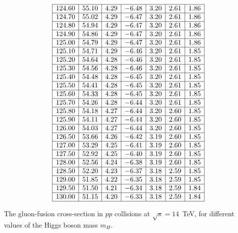\begin{table}[!h]
\begin{center}
\begin{equation}
\begin{array}{|c|c|c|c|c|c|c|}
\hline 
124.60 & 55.10 & 4.29 & -6.48 & 3.20 & 2.61 & 1.86\\
\hline 
124.70 & 55.02 & 4.29 & -6.47 & 3.20 & 2.61 & 1.86\\
\hline 
124.80 & 54.94 & 4.29 & -6.47 & 3.20 & 2.61 & 1.86\\
\hline 
124.90 & 54.86 & 4.29 & -6.47 & 3.20 & 2.61 & 1.86\\
\hline 
125.00 & 54.79 & 4.29 & -6.47 & 3.20 & 2.61 & 1.86\\
\hline 
125.10 & 54.71 & 4.29 & -6.46 & 3.20 & 2.61 & 1.85\\
\hline 
125.20 & 54.64 & 4.28 & -6.46 & 3.20 & 2.61 & 1.85\\
\hline 
125.30 & 54.56 & 4.28 & -6.46 & 3.20 & 2.61 & 1.85\\
\hline 
125.40 & 54.48 & 4.28 & -6.45 & 3.20 & 2.61 & 1.85\\
\hline 
125.50 & 54.41 & 4.28 & -6.45 & 3.20 & 2.61 & 1.85\\
\hline 
125.60 & 54.33 & 4.28 & -6.45 & 3.20 & 2.61 & 1.85\\
\hline 
125.70 & 54.26 & 4.28 & -6.44 & 3.20 & 2.61 & 1.85\\
\hline 
125.80 & 54.18 & 4.27 & -6.44 & 3.20 & 2.60 & 1.85\\
\hline 
125.90 & 54.11 & 4.27 & -6.44 & 3.20 & 2.60 & 1.85\\
\hline 
126.00 & 54.03 & 4.27 & -6.44 & 3.20 & 2.60 & 1.85\\
\hline 
126.50 & 53.66 & 4.26 & -6.42 & 3.19 & 2.60 & 1.85\\
\hline 
127.00 & 53.29 & 4.25 & -6.41 & 3.19 & 2.60 & 1.85\\
\hline 
127.50 & 52.92 & 4.25 & -6.40 & 3.19 & 2.60 & 1.85\\
\hline 
128.00 & 52.56 & 4.24 & -6.38 & 3.19 & 2.60 & 1.85\\
\hline 
128.50 & 52.20 & 4.23 & -6.37 & 3.18 & 2.59 & 1.85\\
\hline 
129.00 & 51.85 & 4.22 & -6.35 & 3.18 & 2.59 & 1.85\\
\hline 
129.50 & 51.50 & 4.21 & -6.34 & 3.18 & 2.59 & 1.84\\
\hline 
130.00 & 51.15 & 4.20 & -6.33 & 3.18 & 2.59 & 1.84\\
\hline
\end{array}
\nonumber
\end{equation}
\end{center}
\caption{The gluon-fusion cross-section in $pp$ collisions at $\sqrt{s}=14$~TeV, for different values of the Higgs boson mass $m_H$. \label{ggF:14TeV}}
\end{table}

